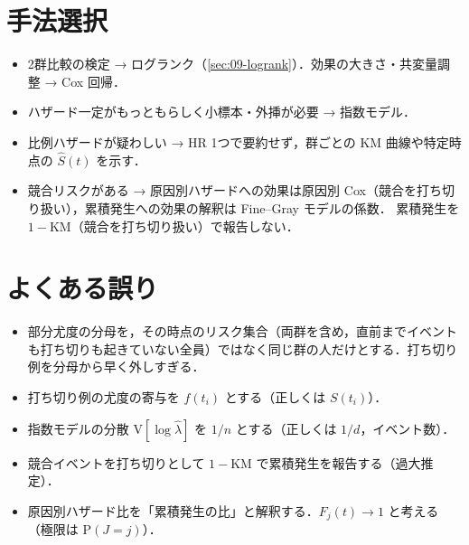 \documentclass[a4paper,11pt,openany]{ltjsbook}
\newcommand{\V}{\mathrm{V}}
\newcommand{\Prob}{\mathrm{P}}
\begin{document}
\section{手法選択}\label{sec:10-choice}
\begin{itemize}
\item 2群比較の検定 → ログランク（\cref{sec:09-logrank}）．効果の大きさ・共変量調整 → Cox 回帰．
\item ハザード一定がもっともらしく小標本・外挿が必要 → 指数モデル．
\item 比例ハザードが疑わしい → HR 1つで要約せず，群ごとの KM 曲線や特定時点の $\hat S(t)$ を示す．
\item 競合リスクがある → 原因別ハザードへの効果は原因別 Cox（競合を打ち切り扱い），累積発生への効果の解釈は Fine--Gray モデルの係数．
      累積発生を $1-\mathrm{KM}$（競合を打ち切り扱い）で報告しない．
\end{itemize}

\section{よくある誤り}\label{sec:10-err}
\begin{warnbox}
\begin{itemize}
\item 部分尤度の分母を，その時点のリスク集合（両群を含め，直前までイベントも打ち切りも起きていない全員）ではなく同じ群の人だけとする．打ち切り例を分母から早く外しすぎる．
\item 打ち切り例の尤度の寄与を $f(t_i)$ とする（正しくは $S(t_i)$）．
\item 指数モデルの分散 $\V[\log\hat\lambda]$ を $1/n$ とする（正しくは $1/d$，イベント数）．
\item 競合イベントを打ち切りとして $1-\mathrm{KM}$ で累積発生を報告する（過大推定）．
\item 原因別ハザード比を「累積発生の比」と解釈する．$F_j(t)\to1$ と考える（極限は $\Prob(J=j)$）．
\end{itemize}
\end{warnbox}
\end{document}
